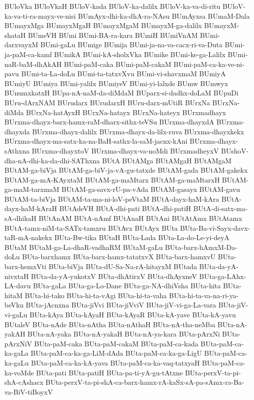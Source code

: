 {BUloVka
BUloVkaH
BUloV-kada
BUloV-ka-dalilx
BUloV-ka-va-di-ritu
BUloV-ka-va-ti-ra-mayx-ve-nisi
BUmAyx-dhi-ka-dhA-ra-NAsu
BUmAyxsa
BUmaM-Dala
BUmayxMga
BUmayxMgaH
BUmayxMgaM
BUmayxM-ga-dalilx
BUmayxM-shataH
BUmeVH
BUmi
BUmi-BA-ra-kara
BUmiH
BUmiVnAM
BUmi-darxvayxM
BUmi-gaLu
BUmige
BUmija
BUmi-ja-na-va-cacx-ri-va-Duta
BUmi-ja-paM-ca-kamf
BUmikA
BUmi-kA-sholxVka
BUmike
BUmi-ke-ga-Lalilx
BUmi-naR-baM-dhAkAH
BUmi-paM-caka
BUmi-paM-cakaM
BUmi-paM-ca-ka-ve-ni-pavu
BUmi-ta-La-doLu
BUmi-ta-tatxvXvu
BUmi-vi-shavxmaM
BUmiyA
BUmiyU
BUmiya
BUmi-yalilx
BUmiyeV
BUmi-yi-lalxde
BUmw
BUmwyx
BUnumxkatxH
BUpa-nA-naM-da-diMdaM
BUparx-si-dadhx-doLaM
BUpuDi
BUru-dArxNAM
BUrudarx
BUrudarxH
BUru-darx-mUtiR
BUrxNa
BUrxNa-diMda
BUrxNa-hatAyxH
BUrxNa-hatayx
BUrxNa-hateyx
BUrxmadhayx
BUrxma-dhayx-barx-hamx-raM-dharx-sithx-teVSu
BUrxma-dhayxdA
BUrxma-dhayxda
BUrxma-dhayx-dalilx
BUrxma-dhayx-da-lilx-ruva
BUrxma-dhayxkekx
BUrxma-dhayx-ma-satx-ka-na-BaH-sathx-la-saM-jacnx-kAni
BUrxma-dhayx-sAthxna
BUrxma-dhayxtoV
BUrxma-dhayx-va-noMdi
BUrxmadheyxV
BUshoV-dha-nA-dhi-ka-da-dhi-SAThxna
BUtA
BUtAMga
BUtAMgaH
BUtAMgaM
BUtAM-ga-biVja
BUtAM-ga-biV-ja-vA-gu-tatxde
BUtAM-gada
BUtAM-gakekx
BUtAM-ga-mA-KAyxtaM
BUtAM-ga-maMtarx
BUtAM-ga-maMtarxH
BUtAM-ga-maM-tarxmaM
BUtAM-ga-savx-rU-pa-vAda
BUtAM-gasayx
BUtAM-gavu
BUtAM-ta-biVja
BUtAM-ta-ma-ni-loV-peVtaM
BUtA-dayx-haM-kAra
BUtA-dayx-haM-kAraH
BUtAdeVH
BUtA-dhi-pati
BUtA-dhi-patiH
BUtA-di-satx-ma-sA-dhikaH
BUtAnAM
BUtA-nAmf
BUtAnaH
BUtAni
BUtAtAmx
BUtAtamx
BUtA-tamx-niM-ta-SATx-tamxru
BUtAvx
BUtAyx
BUta
BUta-Ba-vi-Sayx-davx-taR-mA-nakekx
BUta-Bw-tika
BUtaH
BUta-Lada
BUta-La-do-Le-yi-deyA
BUtaM
BUtaM-ga-La-dhaR-vadhaRM
BUtaM-gaLu
BUta-barx-hAmxM-Da-doLu
BUta-barxhamx
BUta-barx-hamx-tatatxvX
BUta-barx-hamxvU
BUta-barx-hemxVti
BUta-biVja
BUta-dU-Sa-Na-rA-hitayxM
BUtada
BUta-da-yA-nivxtaH
BUta-da-yA-yukotxV
BUta-dhAtirxV
BUta-dhAyxneV
BUta-ga-LAhx-LA-davu
BUta-gaLa
BUta-ga-Lo-Dane
BUta-ga-NA-dhiVsha
BUta-hita
BUta-hitaM
BUta-hi-tako
BUta-hi-ta-vAgi
BUta-hi-ta-vaha
BUta-hi-ta-va-na-ri-ya-beVku
BUta-jAcnxna
BUta-jiVvi
BUta-jiVviV
BUta-jiV-vi-ga-La-vara
BUta-jiV-vi-gaLu
BUta-kAya
BUta-kAyaH
BUta-kAyaR
BUta-kA-yave
BUta-kA-yavu
BUtaleV
BUta-nAde
BUta-nAtha
BUta-nAthaH
BUta-nA-tha-neMba
BUta-nA-yakAH
BUta-nA-yaka
BUta-nA-yakaH
BUta-nA-ya-kara
BUta-pArxNi
BUta-pArxNiV
BUta-paM-caka
BUta-paM-cakaM
BUta-paM-ca-kada
BUta-paM-ca-ka-gaLa
BUta-paM-ca-ka-ga-LiM-dAda
BUta-paM-ca-ka-ga-LigU
BUta-paM-ca-ka-gaLu
BUta-paM-ca-ka-kA-yava
BUta-paM-ca-ka-vaq-tatxyaH
BUta-paM-ca-ka-voMde
BUta-pati
BUta-patiH
BUta-pa-ti-yA-gu-tAtxne
BUta-perxV-ta-pi-shA-cAshacx
BUta-perxV-ta-pi-shA-ca-barx-hamx-rA-kaSx-sA-pa-sAmx-ra-Ba-va-BiV-tiBoyxV
}
